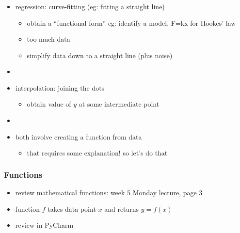 \documentclass[english,14pt]{beamer}
\begin{document}

\begin{frame}[fragile]

\frametitle{}

\begin{itemize}
	\item regression: curve-fitting (eg: fitting a straight line)
	\begin{itemize}
		\item obtain a ``functional form'' eg: identify a model, F=kx for Hookes' law
		\item too much data
		\item simplify data down to a straight line (plus noise)
	\end{itemize}
	\item[]
	\item interpolation: joining the dots
	\begin{itemize}
		\item obtain value of $y$ at some intermediate point
	\end{itemize}
	\item[]
	\item both involve creating a function from data
	\begin{itemize}
		\item that requires some explanation! so let's do that
	\end{itemize}
\end{itemize}

\end{frame}


\begin{frame}[fragile]

\frametitle{Functions}

\begin{itemize}

	\item review mathematical functions: week 5 Monday lecture, page 3
	\item function $f$ takes data point $x$ and returns $y = f(x)$
	\item review in PyCharm
\end{itemize}

\end{frame}

\end{document}
